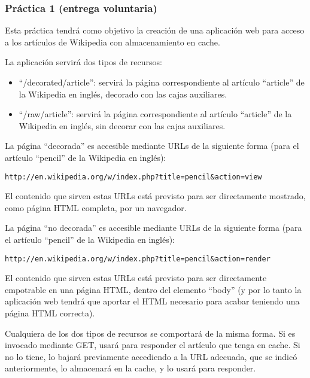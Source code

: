 \subsubsection{Práctica 1 (entrega voluntaria)}
\label{subsec:practica-vol-1-2011}


Esta práctica tendrá como objetivo la creación de una aplicación web para acceso a los artículos de Wikipedia con almacenamiento en cache.

La aplicación servirá dos tipos de recursos:

\begin{itemize}
\item ``/decorated/article'': servirá la página correspondiente al artículo ``article'' de la Wikipedia en inglés, decorado con las cajas auxiliares.
\item ``/raw/article'': servirá la página correspondiente al artículo ``article'' de la Wikipedia en inglés, sin decorar con las cajas auxiliares.
\end{itemize}

La página ``decorada'' es accesible mediante URLs de la siguiente forma (para el artículo ``pencil'' de la Wikipedia en inglés):

\begin{verbatim}
http://en.wikipedia.org/w/index.php?title=pencil&action=view
\end{verbatim}

El contenido que sirven estas URLs está previsto para ser directamente mostrado, como página HTML completa, por un navegador.

La página ``no decorada'' es accesible mediante URLs de la siguiente forma (para el artículo ``pencil'' de la Wikipedia en inglés):

\begin{verbatim}
http://en.wikipedia.org/w/index.php?title=pencil&action=render
\end{verbatim}

El contenido que sirven estas URLs está previsto para ser directamente empotrable en una página HTML, dentro del elemento ``body'' (y por lo tanto la aplicación web tendrá que aportar el HTML necesario para acabar teniendo una página HTML correcta).

Cualquiera de los dos tipos de recursos se comportará de la misma forma. Si es invocado mediante GET, usará para responder el artículo que tenga en cache. Si no lo tiene, lo bajará previamente accediendo a la URL adecuada, que se indicó anteriormente, lo almacenará en la cache, y lo usará para responder.

